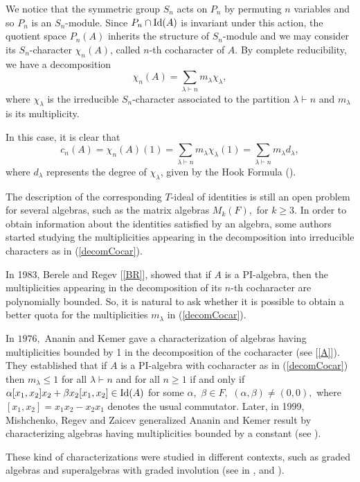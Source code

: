 \documentclass{amsart}
\newcommand{\Id}[1]{\ensuremath{\textnormal{Id}({#1})}}
\numberwithin{equation}{section}
\begin{document}
We notice that the symmetric group
$S_n$ acts on $P_n$ by permuting $n$ variables and so $P_n$ is an $S_n$-module. Since $P_n \cap \Id A$ is invariant
under this action,  the quotient space $P_n(A)$ inherits the structure of $S_n$-module and we may consider its $S_n$-character $\chi_n(A)$, called $n$-th cocharacter of $A$. By complete reducibility, we have a decomposition
\begin{equation}\label{decomCocar}
\chi_n( A) = \sum\limits_{\lambda\vdash n}m_{\lambda}\chi_{\lambda},\end{equation}
 where $\chi_{\lambda}$ is the irreducible $S_n$-character associated to the partition $\lambda\vdash n$ and $m_{\lambda}$ is its multiplicity. 

In this case, it is clear that
$$
c_n(A)=\chi_n(A)(1) = \sum\limits_{\lambda \vdash n}
m_{\lambda}\chi_{\lambda}(1) = \sum\limits_{\lambda \vdash n}
m_{\lambda}d_{\lambda},
$$
 where 
$d_{\lambda}$ represents the degree of $\chi_{\lambda}$, given by the Hook Formula (\cite[Theorem 3.10.2]{S}).

The description of the corresponding $T$-ideal of identities is still an open problem for several algebras, such as the matrix algebras $M_k(F),$ for $k \ge 3.$  In order to obtain information about the identities satisfied by an algebra, some authors started studying the multiplicities appearing in the decomposition into irreducible characters as in (\ref{decomCocar}). 

 In 1983, Berele and Regev [\ref{BR}], showed that if $A$ is a PI-algebra,  then the multiplicities appearing in the decomposition of its $n$-th cocharacter are polynomially bounded. So, it is natural to ask whether it is possible to obtain a better quota for the multiplicities $m_{\lambda}$ in (\ref{decomCocar}). 

  In $1976,$ Ananin and Kemer gave a characterization of algebras having multiplicities bounded by 1 in the decomposition of the cocharacter (see [\ref{A}]). They  established  that if $A$ is a PI-algebra  
 with cocharacter as in (\ref{decomCocar}) then $m_{\lambda} \le 1$ for all $\lambda \vdash n$ and for all $n \ge 1$ if and only if $\alpha[x_1,x_2]x_2+\beta x_2[x_1,x_2]\in \Id A$ for some $\alpha,$ $\beta \in F,$ $(\alpha, \beta)\neq (0,0),$  where $[x_1,x_2]=x_1x_2-x_2x_1$ denotes the usual commutator. Later, in 1999, Mishchenko, Regev and Zaicev generalized Ananin and Kemer result by characterizing algebras having multiplicities bounded by a constant (see \cite{MRZ}). 

 These kind of characterizations were studied in different contexts, such as graded algebras and superalgebras with graded involution (see in \cite{GPV}, \cite{GC} and \cite{F}). 
\end{document}
